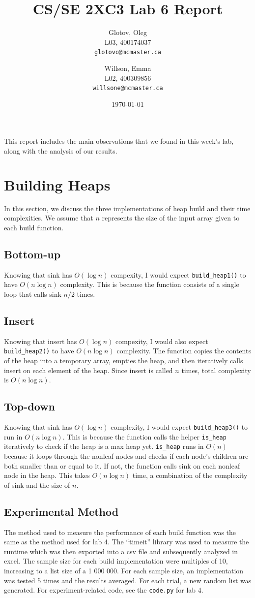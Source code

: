 \documentclass[12pt]{article}
\title{CS/SE 2XC3 Lab 6 Report}
\author{
  Glotov, Oleg\\ L03, 400174037\\
  \texttt{glotovo@mcmaster.ca}
  \and
  Willson, Emma\\ L02, 400309856\\
  \texttt{willsone@mcmaster.ca}
  }
\date{\today}
\begin{document}
\maketitle

This report includes the main observations that we found in this week's lab, along with the analysis of our results.

\newpage 
\section{Building Heaps}
In this section, we discuss the three implementations of heap build and their time complexities. We assume that $n$ represents the size of the input array given to each build function.
\subsection{Bottom-up}
Knowing that sink has $O(\log{n})$ compexity, I would expect \verb+build_heap1()+ to have $O(n\log{n})$ complexity. This is because the function consists of a single loop that calls sink $n/2$ times. 
\subsection{Insert}
Knowing that insert has $O(\log{n})$ compexity, I would also expect \verb+build_heap2()+ to have $O(n\log{n})$ complexity. The function copies the contents of the heap into a temporary array, empties the heap, and then iteratively calls insert on each element of the heap. Since insert is called $n$ times, total complexity is $O(n\log{n})$.
\subsection{Top-down}
Knowing that sink has $O(\log{n})$ complexity, I would expect \verb+build_heap3()+ to run in $O(n\log{n})$. This is because the function calls the helper \verb+is_heap+ iteratively to check if the heap is a max heap yet. \verb+is_heap+ runs in $O(n)$ because it loops through the nonleaf nodes and checks if each node's children are both smaller than or equal to it. If not, the function calls sink on each nonleaf node in the heap. This takes $O(n\log{n})$ time, a combination of the complexity of sink and the size of $n$. 
\subsection{Experimental Method}
The method used to measure the performance of each build function was the same as the method used for lab 4. The “timeit” library was used to measure the runtime which was then exported into a csv file and subsequently analyzed in excel. The sample size for each build implementation were multiples of 10, increasing to a list size of a 1 000 000. For each sample size, an implementation was tested 5 times and the results averaged. For each trial, a new random list was generated. For experiment-related code, see the \verb+code.py+ for lab 4.
\end{document}
